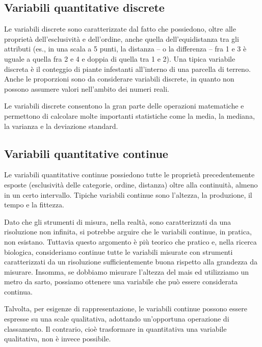 \documentclass[a4paper,12pt,oneside]{book}
\begin{document}
\hypertarget{variabili-quantitative-discrete}{%
\subsection{Variabili quantitative discrete}\label{variabili-quantitative-discrete}}

Le variabili discrete sono caratterizzate dal fatto che possiedono, oltre alle proprietà dell'esclusività e dell'ordine, anche quella dell'equidistanza tra gli attributi (es., in una scala a 5 punti, la distanza -- o la differenza -- fra 1 e 3 è uguale a quella fra 2 e 4 e doppia di quella tra 1 e 2). Una tipica variabile discreta è il conteggio di piante infestanti all'interno di una parcella di terreno. Anche le proporzioni sono da considerare variabili discrete, in quanto non possono assumere valori nell'ambito dei numeri reali.

Le variabili discrete consentono la gran parte delle operazioni matematiche e permettono di calcolare molte importanti statistiche come la media, la mediana, la varianza e la deviazione standard.

\hypertarget{variabili-quantitative-continue}{%
\subsection{Variabili quantitative continue}\label{variabili-quantitative-continue}}

Le variabili quantitative continue possiedono tutte le proprietà precedentemente esposte (esclusività delle categorie, ordine, distanza) oltre alla continuità, almeno in un certo intervallo. Tipiche variabili continue sono l'altezza, la produzione, il tempo e la fittezza.

Dato che gli strumenti di misura, nella realtà, sono caratterizzati da una risoluzione non infinita, si potrebbe arguire che le variabili continue, in pratica, non esistano. Tuttavia questo argomento è più teorico che pratico e, nella ricerca biologica, consideriamo continue tutte le variabili misurate con strumenti caratterizzati da un risoluzione sufficientemente buona rispetto alla grandezza da misurare. Insomma, se dobbiamo misurare l'altezza del mais ed utilizziamo un metro da sarto, possiamo ottenere una variabile che può essere considerata continua.

Talvolta, per esigenze di rappresentazione, le variabili continue possono essere espresse su una scale qualitativa, adottando un'opportuna operazione di classamento. Il contrario, cioè trasformare in quantitativa una variabile qualitativa, non è invece possibile.
\end{document}
